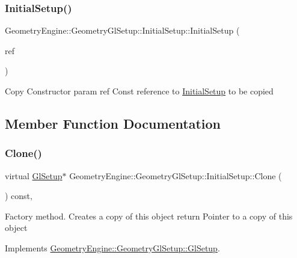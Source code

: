 \subsubsection{\texorpdfstring{InitialSetup()}{InitialSetup()}}
{\footnotesize\ttfamily Geometry\+Engine\+::\+Geometry\+Gl\+Setup\+::\+Initial\+Setup\+::\+Initial\+Setup (\begin{DoxyParamCaption}\item[{const \mbox{\hyperlink{class_geometry_engine_1_1_geometry_gl_setup_1_1_initial_setup}{Initial\+Setup}} \&}]{ref }\end{DoxyParamCaption})\hspace{0.3cm}{\ttfamily [inline]}}

Copy Constructor param ref Const reference to \mbox{\hyperlink{class_geometry_engine_1_1_geometry_gl_setup_1_1_initial_setup}{Initial\+Setup}} to be copied 

\subsection{Member Function Documentation}
\mbox{\label{class_geometry_engine_1_1_geometry_gl_setup_1_1_initial_setup_ade45cd909edd6ff3cae7323d5e1c53d0}} 
\subsubsection{\texorpdfstring{Clone()}{Clone()}}
{\footnotesize\ttfamily virtual \mbox{\hyperlink{class_geometry_engine_1_1_geometry_gl_setup_1_1_gl_setup}{Gl\+Setup}}$\ast$ Geometry\+Engine\+::\+Geometry\+Gl\+Setup\+::\+Initial\+Setup\+::\+Clone (\begin{DoxyParamCaption}{ }\end{DoxyParamCaption}) const\hspace{0.3cm}{\ttfamily [inline]}, {\ttfamily [virtual]}}

Factory method. Creates a copy of this object return Pointer to a copy of this object 

Implements \mbox{\hyperlink{class_geometry_engine_1_1_geometry_gl_setup_1_1_gl_setup_adf97b18fd8af32c63a189983ab35d5ae}{Geometry\+Engine\+::\+Geometry\+Gl\+Setup\+::\+Gl\+Setup}}.

